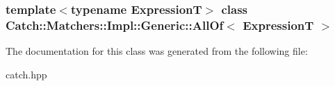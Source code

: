 \subsubsection*{template$<$typename ExpressionT$>$ class Catch::Matchers::Impl::Generic::AllOf$<$ ExpressionT $>$}



The documentation for this class was generated from the following file:\begin{DoxyCompactItemize}
\item 
catch.hpp\end{DoxyCompactItemize}
